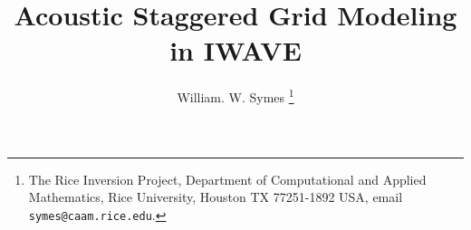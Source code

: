 
\title{Acoustic Staggered Grid Modeling in IWAVE}
\author{William. W. Symes \thanks{The Rice Inversion Project,
Department of Computational and Applied Mathematics, Rice University,
Houston TX 77251-1892 USA, email {\tt symes@caam.rice.edu}.}}

\maketitle



%

